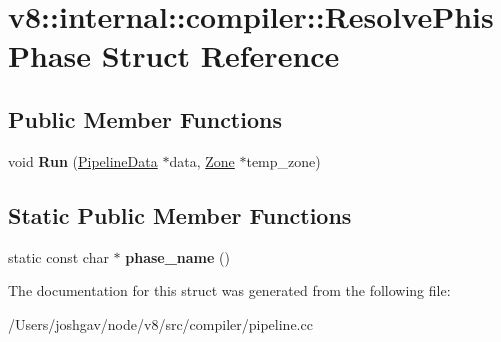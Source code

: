 \hypertarget{structv8_1_1internal_1_1compiler_1_1_resolve_phis_phase}{}\section{v8\+:\+:internal\+:\+:compiler\+:\+:Resolve\+Phis\+Phase Struct Reference}
\label{structv8_1_1internal_1_1compiler_1_1_resolve_phis_phase}
\subsection*{Public Member Functions}
\begin{DoxyCompactItemize}
\item 
void {\bfseries Run} (\hyperlink{classv8_1_1internal_1_1compiler_1_1_pipeline_data}{Pipeline\+Data} $\ast$data, \hyperlink{classv8_1_1internal_1_1_zone}{Zone} $\ast$temp\+\_\+zone)\hypertarget{structv8_1_1internal_1_1compiler_1_1_resolve_phis_phase_a49f895e0ae2dc93df7523d04d30c5481}{}\label{structv8_1_1internal_1_1compiler_1_1_resolve_phis_phase_a49f895e0ae2dc93df7523d04d30c5481}

\end{DoxyCompactItemize}
\subsection*{Static Public Member Functions}
\begin{DoxyCompactItemize}
\item 
static const char $\ast$ {\bfseries phase\+\_\+name} ()\hypertarget{structv8_1_1internal_1_1compiler_1_1_resolve_phis_phase_a8b1c5d7d1bb306937e452126b8f8b791}{}\label{structv8_1_1internal_1_1compiler_1_1_resolve_phis_phase_a8b1c5d7d1bb306937e452126b8f8b791}

\end{DoxyCompactItemize}


The documentation for this struct was generated from the following file\+:\begin{DoxyCompactItemize}
\item 
/\+Users/joshgav/node/v8/src/compiler/pipeline.\+cc\end{DoxyCompactItemize}
